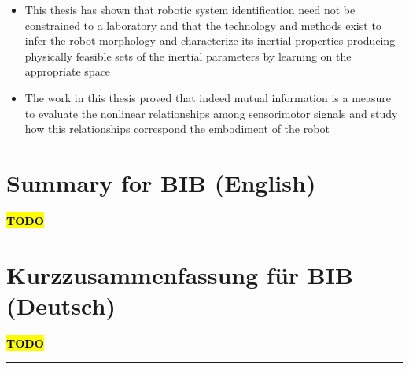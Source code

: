 \documentclass[12pt, a4paper]{article}
\newcommand{\TODO}{\hl{\textbf{TODO}}}
\begin{document}
\begin{enumerate}
\begin{itemize}
	\item This thesis has shown that robotic system identification need not be constrained to a laboratory and that the technology and methods exist to infer the robot morphology and characterize its inertial properties producing physically feasible sets of the inertial parameters by learning on the appropriate space
	
	\item The work in this thesis proved that indeed mutual information is a measure to evaluate the nonlinear relationships among sensorimotor signals and study how this relationships correspond the embodiment of the robot	
\end{itemize}

\section*{Summary for BIB (English)}
\TODO

\section*{Kurzzusammenfassung für BIB (Deutsch)}
\TODO

\rule{\textwidth}{0.4pt}



\end{enumerate}
\end{document}
